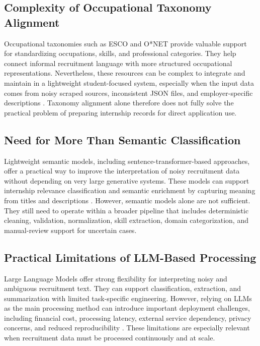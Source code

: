 \subsection{Complexity of Occupational Taxonomy Alignment}

Occupational taxonomies such as ESCO and O*NET provide valuable support for standardizing occupations, skills, and professional categories. They help connect informal recruitment language with more structured occupational representations. Nevertheless, these resources can be complex to integrate and maintain in a lightweight student-focused system, especially when the input data comes from noisy scraped sources, inconsistent JSON files, and employer-specific descriptions \cite{staab2009handbook}. Taxonomy alignment alone therefore does not fully solve the practical problem of preparing internship records for direct application use.

\subsection{Need for More Than Semantic Classification}

Lightweight semantic models, including sentence-transformer-based approaches, offer a practical way to improve the interpretation of noisy recruitment data without depending on very large generative systems. These models can support internship relevance classification and semantic enrichment by capturing meaning from titles and descriptions \cite{senger2024deep, zhang2024nnose}. However, semantic models alone are not sufficient. They still need to operate within a broader pipeline that includes deterministic cleaning, validation, normalization, skill extraction, domain categorization, and manual-review support for uncertain cases.

\subsection{Practical Limitations of LLM-Based Processing}

Large Language Models offer strong flexibility for interpreting noisy and ambiguous recruitment text. They can support classification, extraction, and summarization with limited task-specific engineering. However, relying on LLMs as the main processing method can introduce important deployment challenges, including financial cost, processing latency, external service dependency, privacy concerns, and reduced reproducibility \cite{bender2021dangers, schwartz2020green, menghani2023efficient}. These limitations are especially relevant when recruitment data must be processed continuously and at scale.

